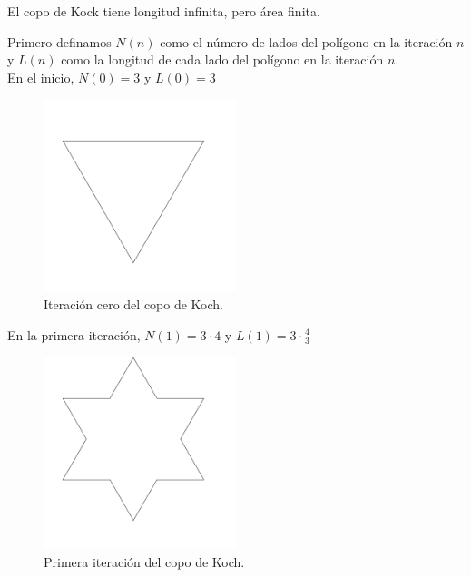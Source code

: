 \begin{theorem}
    El copo de Kock tiene longitud infinita, pero área finita. \cite{youtube-2022}
\end{theorem}

\noindent Primero definamos $N(n)$ como el número de lados del polígono en la iteración $n$ y $L(n)$ como la longitud de cada lado del polígono en la iteración $n$.\\

\noindent En el inicio, $N(0) = 3$ y $L(0) = 3$\\

\begin{figure}[H]
    \centering
    \includegraphics[width=0.5\textwidth]{figures/koch-snowflake-iteration-0.png}
    \caption{Iteración cero del copo de Koch.}
    \label{fig:koch-snowflake-iteration-0}
\end{figure}

\noindent En la primera iteración, $N(1) = 3 \cdot 4$ y $L(1) = 3 \cdot \frac{4}{3}$\\

\begin{figure}[H]
    \centering
    \includegraphics[width=0.5\textwidth]{figures/koch-snowflake-iteration-1.png}
    \caption{Primera iteración del copo de Koch.}
    \label{fig:koch-snowflake-iteration-1}
\end{figure}

